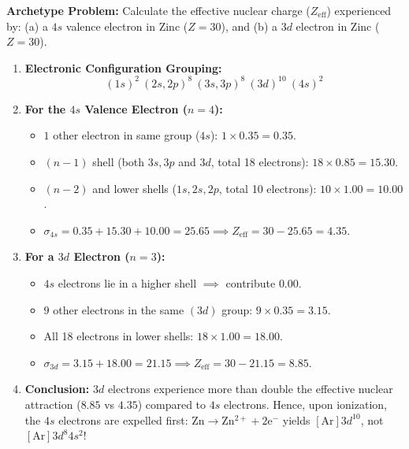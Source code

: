\documentclass[10pt,twoside,openright]{book}
\begin{document}
\begin{usecasebox}
\textbf{Archetype Problem:} Calculate the effective nuclear charge ($Z_{\text{eff}}$) experienced by: (a) a $4s$ valence electron in Zinc ($Z=30$), and (b) a $3d$ electron in Zinc ($Z=30$).
\begin{enumerate}
  \item \textbf{Electronic Configuration Grouping:}
  \begin{equation*}
    (1s)^2 \ (2s, 2p)^8 \ (3s, 3p)^8 \ (3d)^{10} \ (4s)^2
  \end{equation*}
  \item \textbf{For the $4s$ Valence Electron ($n=4$):}
  \begin{itemize}
    \item $1$ other electron in same group ($4s$): $1 \times 0.35 = 0.35$.
    \item $(n-1)$ shell (both $3s, 3p$ and $3d$, total 18 electrons): $18 \times 0.85 = 15.30$.
    \item $(n-2)$ and lower shells ($1s, 2s, 2p$, total 10 electrons): $10 \times 1.00 = 10.00$.
    \item $\sigma_{4s} = 0.35 + 15.30 + 10.00 = 25.65 \implies Z_{\text{eff}} = 30 - 25.65 = \mathbf{4.35}$.
  \end{itemize}
  \item \textbf{For a $3d$ Electron ($n=3$):}
  \begin{itemize}
    \item $4s$ electrons lie in a higher shell $\implies$ contribute $0.00$.
    \item $9$ other electrons in the same $(3d)$ group: $9 \times 0.35 = 3.15$.
    \item All 18 electrons in lower shells: $18 \times 1.00 = 18.00$.
    \item $\sigma_{3d} = 3.15 + 18.00 = 21.15 \implies Z_{\text{eff}} = 30 - 21.15 = \mathbf{8.85}$.
  \end{itemize}
  \item \textbf{Conclusion:} $3d$ electrons experience more than double the effective nuclear attraction ($8.85$ vs $4.35$) compared to $4s$ electrons. Hence, upon ionization, the $4s$ electrons are expelled first: $\mathrm{Zn \to Zn^{2+} + 2e^-}$ yields $[\mathrm{Ar}] 3d^{10}$, not $[\mathrm{Ar}] 3d^8 4s^2$!
\end{enumerate}
\end{usecasebox}
\end{document}
